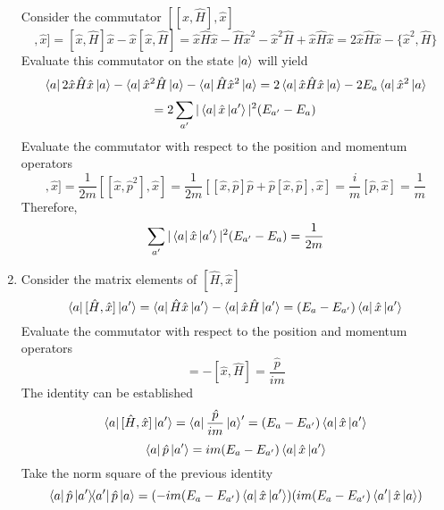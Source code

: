 \begin{sol}
\begin{enumerate}[label=\textbf{(\alph*)}]
Consider the commutator $[[\hat x,\hat H],\hat x]$
\begin{equation}
	[[\hat x,\hat H],\hat x]=[\hat x,\hat H]\hat x-\hat x[\hat x,\hat H]=\hat x\hat H\hat x-\hat H\hat x^2-\hat x^2\hat H+\hat x\hat H\hat x=2\hat x\hat H\hat x-\{\hat x^2,\hat H\}
\end{equation} 
Evaluate this commutator on the state $\ket a$ will yield
\begin{equation}
	\bra a 2\hat x\hat H\hat x\ket a-\bra a\hat x^2\hat H\ket a-\bra a\hat H\hat x^2\ket a=2\bra a \hat x\hat H\hat x\ket a-2E_a\bra a\hat x^2\ket a
\end{equation}
\begin{equation}
	=2\sum_{a'}|\bra a\hat x\ket{a'}|^2(E_{a'}-E_a)
\end{equation} 
Evaluate the commutator with respect to the position and momentum operators
\begin{equation}
	[[\hat x,\hat H],\hat x]=\frac{1}{2m}[[\hat x,\hat p^2],\hat x]=\frac{1}{2m}[[\hat x,\hat p]\hat p+\hat p[\hat x,\hat p],\hat x]=\frac{i}{m}[\hat p,\hat x]=\frac{1}{m}
\end{equation}   
Therefore,
\begin{equation}
	\sum_{a'}|\bra a\hat x\ket{a'}|^2(E_{a'}-E_a)=\frac{1}{2m}
\end{equation}
\item
Consider the matrix elements of $[\hat H,\hat x]$
\begin{equation}
	\bra a[\hat H,\hat x]\ket {a'}=\bra a\hat H\hat x\ket{a'}-\bra a\hat x\hat H\ket {a'}=(E_a-E_{a'})\bra a\hat x\ket {a'}
\end{equation} 
Evaluate the commutator with respect to the position and momentum operators
\begin{equation}
	[\hat H,\hat x]=-[\hat x,\hat H]=\frac{\hat p}{im}
\end{equation}
The identity can be established
\begin{equation}
	\bra a[\hat H,\hat x]\ket {a'}=\bra a\frac{\hat p}{im}\ket a'=(E_a-E_{a'})\bra a\hat x\ket {a'}
\end{equation}
\begin{equation}
	\bra a\hat p\ket {a'}=im(E_a-E_{a'})\bra a\hat x\ket{a'}
\end{equation} 
Take the norm square of the previous identity
\begin{equation}
	\bra a\hat p\ketbra{a'}\hat p\ket a=(-im(E_a-E_{a'})\bra a\hat x\ket{a'})(im(E_a-E_{a'})\bra {a'}\hat x\ket{a})
\end{equation}

\end{enumerate}
\end{sol}
